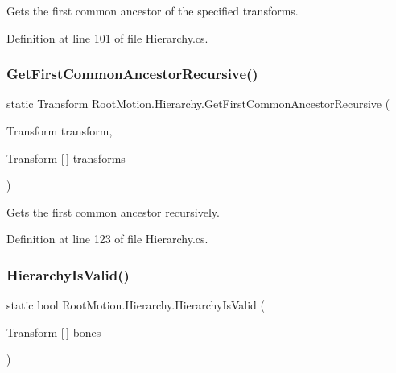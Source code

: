 Gets the first common ancestor of the specified transforms. 



Definition at line 101 of file Hierarchy.\+cs.

\mbox{\label{class_root_motion_1_1_hierarchy_a3c9473033f81042f0e9676b68c2f341e}} 
\subsubsection{\texorpdfstring{Get\+First\+Common\+Ancestor\+Recursive()}{GetFirstCommonAncestorRecursive()}}
{\footnotesize\ttfamily static Transform Root\+Motion.\+Hierarchy.\+Get\+First\+Common\+Ancestor\+Recursive (\begin{DoxyParamCaption}\item[{Transform}]{transform,  }\item[{Transform \mbox{[}$\,$\mbox{]}}]{transforms }\end{DoxyParamCaption})\hspace{0.3cm}{\ttfamily [static]}}



Gets the first common ancestor recursively. 



Definition at line 123 of file Hierarchy.\+cs.

\mbox{\label{class_root_motion_1_1_hierarchy_aa3bcbe936d626ff3f02f1f1d9950c845}} 
\subsubsection{\texorpdfstring{Hierarchy\+Is\+Valid()}{HierarchyIsValid()}}
{\footnotesize\ttfamily static bool Root\+Motion.\+Hierarchy.\+Hierarchy\+Is\+Valid (\begin{DoxyParamCaption}\item[{Transform \mbox{[}$\,$\mbox{]}}]{bones }\end{DoxyParamCaption})\hspace{0.3cm}{\ttfamily [static]}}



